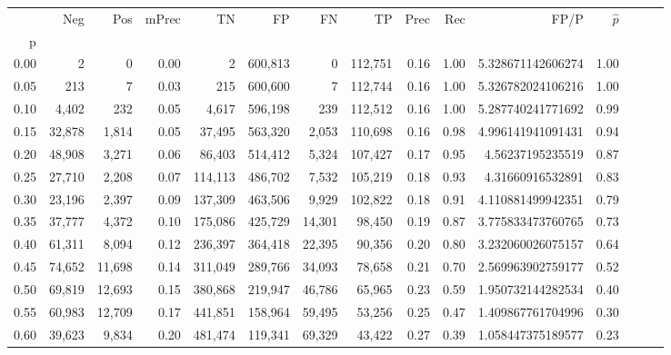 \begin{tabular}{rrrrrrrrrrrrrrr}
\toprule
{} &     Neg &     Pos & mPrec &       TN &       FP &       FN &       TP &  Prec &   Rec &                   FP/P & $\hat{p}$ \\
p    &         &         &       &          &          &          &          &       &       &                        &           \\
\midrule
0.00 &       2 &       0 &  0.00 &        2 &  600,813 &        0 &  112,751 &  0.16 &  1.00 &      5.328671142606274 &      1.00 \\
0.05 &     213 &       7 &  0.03 &      215 &  600,600 &        7 &  112,744 &  0.16 &  1.00 &      5.326782024106216 &      1.00 \\
0.10 &   4,402 &     232 &  0.05 &    4,617 &  596,198 &      239 &  112,512 &  0.16 &  1.00 &      5.287740241771692 &      0.99 \\
0.15 &  32,878 &   1,814 &  0.05 &   37,495 &  563,320 &    2,053 &  110,698 &  0.16 &  0.98 &      4.996141941091431 &      0.94 \\
0.20 &  48,908 &   3,271 &  0.06 &   86,403 &  514,412 &    5,324 &  107,427 &  0.17 &  0.95 &       4.56237195235519 &      0.87 \\
0.25 &  27,710 &   2,208 &  0.07 &  114,113 &  486,702 &    7,532 &  105,219 &  0.18 &  0.93 &       4.31660916532891 &      0.83 \\
0.30 &  23,196 &   2,397 &  0.09 &  137,309 &  463,506 &    9,929 &  102,822 &  0.18 &  0.91 &      4.110881499942351 &      0.79 \\
0.35 &  37,777 &   4,372 &  0.10 &  175,086 &  425,729 &   14,301 &   98,450 &  0.19 &  0.87 &      3.775833473760765 &      0.73 \\
0.40 &  61,311 &   8,094 &  0.12 &  236,397 &  364,418 &   22,395 &   90,356 &  0.20 &  0.80 &      3.232060026075157 &      0.64 \\
0.45 &  74,652 &  11,698 &  0.14 &  311,049 &  289,766 &   34,093 &   78,658 &  0.21 &  0.70 &      2.569963902759177 &      0.52 \\
0.50 &  69,819 &  12,693 &  0.15 &  380,868 &  219,947 &   46,786 &   65,965 &  0.23 &  0.59 &      1.950732144282534 &      0.40 \\
0.55 &  60,983 &  12,709 &  0.17 &  441,851 &  158,964 &   59,495 &   53,256 &  0.25 &  0.47 &      1.409867761704996 &      0.30 \\
0.60 &  39,623 &   9,834 &  0.20 &  481,474 &  119,341 &   69,329 &   43,422 &  0.27 &  0.39 &      1.058447375189577 &      0.23 \\

\end{tabular}
